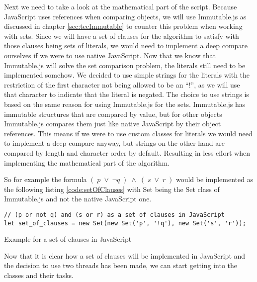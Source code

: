 Next we need to take a look at the mathematical part of the script. Because JavaScript uses references when comparing objects, we will use Immutable.js as discussed in chapter \ref{sec:tecImmutable} to counter this problem when working with sets. Since we will have a set of clauses for the algorithm to satisfy with those clauses being sets of literals, we would need to implement a deep compare ourselves if we were to use native JavaScript. Now that we know that Immutable.js will solve the set comparison problem, the literals still need to be implemented somehow. We decided to use simple strings for the literals with the restriction of the first character not being allowed to be an ``!'', as we will use that character to indicate that the literal is negated. The choice to use strings is based on the same reason for using Immutable.js for the sets. Immutable.js has immutable structures that are compared by value, but for other objects Immutable.js compares them just like native JavaScript by their object references. This means if we were to use custom classes for literals we would need to implement a deep compare anyway, but strings on the other hand are compared by length and character order by default. Resulting in less effort when implementing the mathematical part of the algorithm.

So for example the formula $(\; p\; \lor\; \neg q\; )\; \land\; (\; s\; \lor\; r\; )$ would be implemented as the following listing \ref{code:setOfClauses} with Set being the Set class of Immutable.js and not the native JavaScript one.

\begin{listing}[h!]
\begin{verbatim}
// (p or not q) and (s or r) as a set of clauses in JavaScript
let set_of_clauses = new Set(new Set('p', '!q'), new Set('s', 'r'));
\end{verbatim}
    \caption{Example for a set of clauses in JavaScript}
    \label{code:setOfClauses}
\end{listing}

Now that it is clear how a set of clauses will be implemented in JavaScript and the decision to use two threads has been made, we can start getting into the classes and their tasks.

